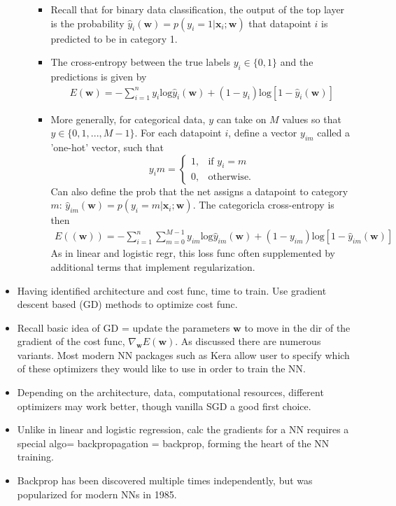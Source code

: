 \documentclass[norsk,a4paper,11pt]{article}
\begin{document}
\begin{itemize}
\begin{itemize}
\begin{itemize}
			\item Recall that for binary data classification, the output of the top layer is the probability $\hat{y}_i(\bm{w}) = p(y_i = 1 | \bm{x}_i ; \bm{w})$ that datapoint $i$ is predicted to be in category 1.
			\item The cross-entropy between the true labels $y_i \in \{0,1\}$ and the predictions is given by 
			\begin{align}
				E(\bm{w}) = - \sum_{i=1}^n y_i \text{log} \hat{y}_i (\bm{w}) + (1-y_i)\text{log} [1 - \hat{y}_i (\bm{w})]
			\end{align} 
			\item More generally, for categorical data, $y$ can take on $M$ values so that $y \in \{ 0, 1, ..., M-1 \}$. For each datapoint $i$, define a vector $y_{im}$ called a 'one-hot' vector, such that
			\[ y_im = \begin{cases}
				 1, & \text{if } y_{i} = m \\
				 0, & \text{otherwise.}  
			\end{cases} \]
			Can also define the prob that the net assigns a datapoint to category $m$: $\hat{y}_{im}(\bm{w}) = p(y_i = m | \bm{x}_i ; \bm{w})$. The categoricla cross-entropy is then
			\begin{align}
				E((\bm{w})) = - \sum_{i=1}^n \sum_{m=0}^{M-1} y_{im} \text{log} \hat{y}_{im} (\bm{w}) + (1-y_{im}) \text{log} [1 - \hat{y}_{im} (\bm{w})]
			\end{align}
			As in linear and logistic regr, this loss func often supplemented by additional terms that implement regularization.
		\end{itemize}
	\end{itemize}
	\item Having identified architecture and cost func, time to train. Use gradient descent based (GD) methods to optimize cost func.
	\item Recall basic idea of GD = update the parameters $\bm{w}$ to move in the dir of the gradient of the cost func, $\nabla_{\bm{w}} E(\bm{w})$. As discussed there are numerous variants. Most modern NN packages such as Kera allow user to specify which of these optimizers they would like to use in order to train the NN.
	\item Depending on the architecture, data, computational resources, different optimizers may work better, though vanilla SGD a good first choice.
	\item Unlike in linear and logistic regression, calc the gradients for a NN requires a special algo= backpropagation = backprop, forming the heart of the NN training.
	\item Backprop has been discovered multiple times independently, but was popularized for modern NNs in 1985. 
\end{itemize}
\end{document}
